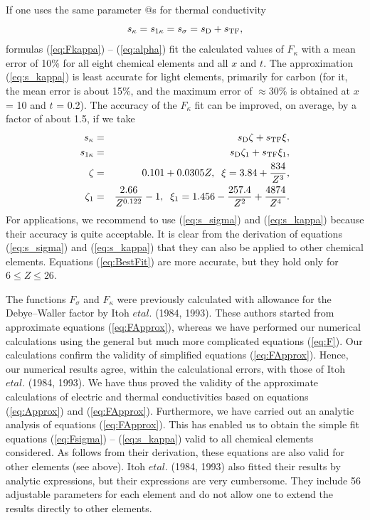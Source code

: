 If one uses the same parameter @s for thermal conductivity
%
\begin{equation}
   s_\kappa = s_{1\kappa} = s_\sigma = s_{\rm D} + s_{\rm TF},
\label{eq:s_kappa}
\end{equation}
%
formulas (\ref{eq:Fkappa}) -- (\ref{eq:alpha}) fit the calculated 
values of $F_\kappa$ with a mean error of 10\% for all eight chemical 
elements and all $x$ and $t$. The approximation (\ref{eq:s_kappa})
is least accurate for light elements, primarily for carbon 
(for it, the mean error is about 15\%, and the maximum
error of $\approx$30\% is obtained at $x$ = 10 and $t$ = 0.2). The
accuracy of the $F_\kappa$ fit can be improved, on average, by
a factor of about 1.5, if we take
%
\begin{eqnarray}
   s_\kappa & = &  s_{\rm D} \zeta +  s_{\rm TF} \xi,
\nonumber \\
   s_{1 \kappa} & = & s_{\rm D} \zeta_1 + s_{\rm TF} \xi_1,
\nonumber \\
   \zeta & = & 0.101 + 0.0305 Z, \; \;
   \xi= 3.84 +{834 \over Z^3},
\nonumber \\
   \zeta_1 & = & {2.66 \over Z^{0.122}}-1, \; \;
   \xi_1=1.456-{257.4 \over Z^2}+{4874 \over Z^4}.
\label{eq:BestFit}
\end{eqnarray}
%
For applications, we recommend to use (\ref{eq:s_sigma}) and
(\ref{eq:s_kappa}) because their accuracy is quite acceptable. 
It is clear from the derivation of equations (\ref{eq:s_sigma}) and
(\ref{eq:s_kappa}) that they can also be applied to other chemical
elements. Equations (\ref{eq:BestFit}) are more accurate, 
but they hold only for $6 \leq Z \leq 26$.

The functions $F_\sigma$ and $F_\kappa$ were previously calculated
with allowance for the Debye--Waller factor by Itoh $et al.$ (1984,
1993). These authors started from approximate equations (\ref{eq:FApprox}),
whereas we have performed our numerical calculations using the general
but much more complicated equations (\ref{eq:F}).
Our calculations confirm the validity of simplified equations
(\ref{eq:FApprox}). Hence, our numerical results agree, 
within the calculational errors, with those of Itoh $et al.$
(1984, 1993). We have thus proved the validity of the approximate 
calculations of electric and thermal conductivities based on equations
(\ref{eq:Approx}) and (\ref{eq:FApprox}). Furthermore, we have carried
out an analytic analysis of equations (\ref{eq:FApprox}). 
This has enabled us to obtain the simple fit equations (\ref{eq:Fsigma}) --
(\ref{eq:s_kappa}) valid to all chemical elements considered. 
As follows from their derivation, these equations
are also valid for other elements (see above). Itoh $et al.$ 
(1984, 1993) also fitted their results by analytic expressions, but their
expressions are very cumbersome. They include 56 adjustable 
parameters for each element and do not allow one to extend the 
results directly to other elements. 

